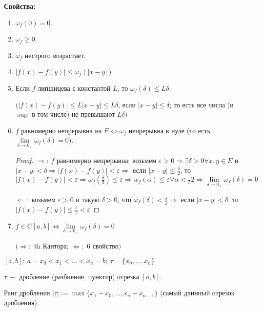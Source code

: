 \begin{statement} \textbf{Свойства:}
    \begin{enumerate}
        \item $\omega_f(0)=0$.
        \item $\omega_f\geq 0$.
        \item $\omega_f$ нестрого возрастает.
        \item $|f(x)-f(y)|\leq \omega_f(|x-y|)$.
        \item Если $f$ липшицева с константой $L$, то $\omega_f(\delta)\leq L\delta$.

        $(|f(x)-f(y)|\leq L|x-y|\leq L\delta$, если $|x-y|\leq \delta$; то есть все числа (и $\sup$ в том числе) не превышают $L\delta)$
        \item $f$ равномерно непрерывна на $E\Leftrightarrow \omega_f$ непрерывна в нуле (то есть $\lim\limits_{\delta\rightarrow0_+}\omega_f(\delta)=0$).
        \begin{proof}
            $\Rightarrow:\ f$ равномерно непрерывна; возьмем $\varepsilon>0\Rightarrow \exists \delta >0\forall x,y\in E$ и $|x-y|<\delta\Rightarrow |f(x)-f(y)|<\varepsilon\Rightarrow$ если $|x-y|\leq\frac{\delta}{2}$, то $|f(x)-f(y)|<\varepsilon\Rightarrow\omega_f(\frac{\delta}{2})\leq \varepsilon\Rightarrow w_f(\alpha)\leq\varepsilon \forall \alpha <\frac{}{\delta}{2}\Rightarrow \lim\limits_{\delta\rightarrow0_+}\omega_f(\delta)=0$

            $\Leftarrow:$ возьмем $\varepsilon>0$ и такую $\delta>0$, что $\omega_f(\delta)<\frac{\varepsilon}{2}\Rightarrow $ если $|x-y|<\delta$, то $|f(x)-f(y)|\leq \frac{\varepsilon}{2}<\varepsilon$
        \end{proof}
        \item $f\in C[a,b]\Leftrightarrow \lim\limits_{\delta\rightarrow0_+}\omega_f(\delta)=0$

        $(\Rightarrow:$ th Кантора; $\Leftarrow:$ 6 свойство$)$
    \end{enumerate}
\end{statement}

\begin{definition}
    $[a,b]:\ a=x_0<x_1<...<x_n=b;\ \tau=\{x_0,...,x_n\}$

    $\tau\ -$ дробление (разбиение, пунктир) отрезка $[a,b]$. 
\end{definition}

\begin{definition}
    Ранг дробления $|\tau|:=\max\{x_1-x_0,...,x_n-x_{n-1}\}$ (самый длинный отрезок дробления).
\end{definition}


